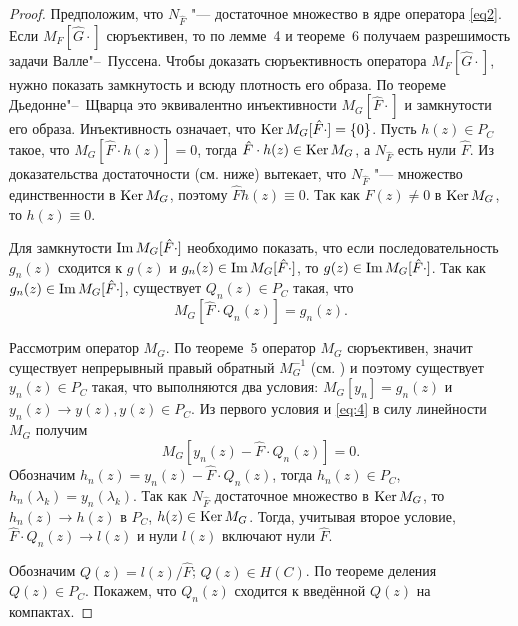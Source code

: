 \begin{proof} Предположим, что $N_{\hat F}$ "--- достаточное множество \cite{zabirova5} в ядре оператора \eqref{eq2}. 
Если $M_F[\hat G\cdot]$ сюръективен, то по лемме~4 и теореме~6 получаем разрешимость задачи Валле"--~Пуссена. 
Чтобы доказать сюръективность оператора $M_F[\hat G\cdot]$, нужно показать замкнутость и всюду плотность его образа. 
По теореме Дьедонне"--~Щварца \cite{zabirova3} это эквивалентно инъективности $M_G[\hat F\cdot]$ и замкнутости его образа. 
Инъективность означает, что $\mathop{\rm Ker} M_G[\hat F\cdot]=\{0\}$. 
Пусть $h(z)\in P_C$ такое, что $M_G[\hat F\cdot h(z)]=0$, тогда $\hat F\cdot h(z)\in \mathop{\rm Ker} M_G$, а $N_{\hat F}$ есть нули $\hat F$. 
Из доказательства достаточности (см. ниже) вытекает, что $N_{\hat F}$ "--- множество единственности в $\mathop{\rm Ker} M_G$, поэтому $\hat Fh(z)\equiv 0$. 
Так как  $\hat F(z)\neq 0$ в $\mathop{\rm Ker} M_G$, то $h(z)\equiv 0$.

Для замкнутости $\mathop{\rm Im} M_G[\hat F\cdot]$ необходимо показать, что если последовательность $g_n(z)$ сходится к $g(z)$ и $g_n(z)\in \mathop{\rm Im} M_G[\hat F\cdot]$,  
то $g(z)\in \mathop{\rm Im} M_G[\hat F\cdot]$. 
Так как $g_n(z)\in \mathop{\rm Im} M_G[\hat F\cdot]$, существует $Q_n(z)\in P_C$ такая, что 
\begin{equation}
\label{eq:4}
M_G[\hat F\cdot Q_n(z)]=g_n(z).
\end{equation}

 

Рассмотрим оператор $M_G$. По теореме~5 оператор $M_G$ сюръективен, значит  существует непрерывный правый обратный $M_G^{-1}$ (см. \cite{zabirova6}) и поэтому существует $y_n(z)\in P_C$ такая, что выполняются два условия: $M_G[y_n]=g_n(z)$ и $y_n(z)\to y(z),y(z)\in P_C$. 
Из первого условия и \eqref{eq:4}  в силу линейности $M_G$ получим 
$$M_G[y_n(z)-\hat F\cdot Q_n(z)]=0.$$ 
Обозначим $h_n(z)=y_n(z)-\hat F\cdot Q_n(z)$, тогда $h_n(z)\in P_C$, 
$h_n(\lambda_k)=y_n(\lambda_k)$. 
Так как $N_{\hat F}$ достаточное множество в $\mathop{\rm Ker} M_G$, то $h_n(z)\to h(z)$ в $P_C$, $h(z)\in \mathop{\rm Ker} M_G$. 
Тогда, учитывая второе условие, $\hat F\cdot Q_n(z)\to l(z)$ и нули $l(z)$ включают нули $\hat F$.

Обозначим $Q(z)={l(z)}/{\hat F}$;  $Q(z)\in H(C)$. 
По теореме деления \cite{zabirova2} $Q(z)\in P_C$. 
Покажем, что $Q_n(z)$ сходится к введённой $Q(z)$ на компактах. 


\end{proof}
